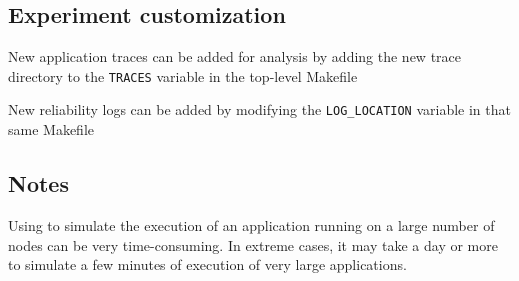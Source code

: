 \subsection{Experiment customization}

New application traces can be added for analysis by adding the new trace
directory to the {\texttt{TRACES}} variable in the top-level Makefile

New reliability logs can be added by modifying the {\texttt{LOG\_LOCATION}}
variable in that same Makefile

\subsection{Notes}

Using \LogGOPSim to simulate the execution of an application running on 
a large number of nodes can be very time-consuming.  In extreme cases,
it may take a day or more to simulate a few minutes of execution of
very large applications.

